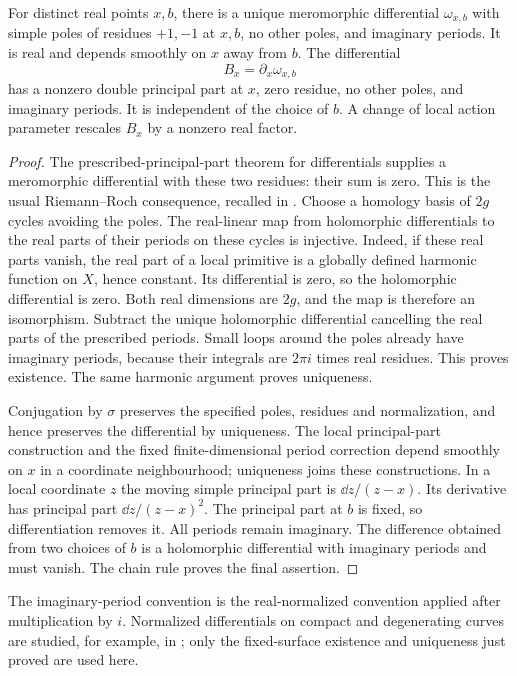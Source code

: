 \begin{lemma}\label{lem:v86-normalized}
For distinct real points $x,b$, there is a unique meromorphic
differential $\omega_{x,b}$ with simple poles of residues $+1,-1$
at $x,b$, no other poles, and imaginary periods. It is real and depends
smoothly on $x$ away from $b$. The differential
\[
                         B_x=\partial_x\omega_{x,b}
\]
has a nonzero double principal part at $x$, zero residue, no other
poles, and imaginary periods. It is independent of the choice of $b$.
A change of local action parameter rescales $B_x$ by a nonzero real
factor.
\end{lemma}
\begin{proof}
The prescribed-principal-part theorem for differentials supplies a
meromorphic differential with these two residues: their sum is zero.
This is the usual Riemann--Roch consequence, recalled in
\cite{V86Forster}. Choose a homology basis of $2g$ cycles avoiding the
poles. The real-linear map from holomorphic differentials to the real
parts of their periods on these cycles is injective. Indeed, if these
real parts vanish, the real part of a local primitive is a globally
defined harmonic function on $X$, hence constant. Its differential is
zero, so the holomorphic differential is zero. Both real dimensions
are $2g$, and the map is therefore an isomorphism. Subtract the unique
holomorphic differential cancelling the real parts of the prescribed
periods. Small loops around the poles already have imaginary periods,
because their integrals are $2\pi i$ times real residues. This proves
existence. The same harmonic argument proves uniqueness.

Conjugation by $\sigma$ preserves the specified poles, residues and
normalization, and hence preserves the differential by uniqueness.
The local principal-part construction and the fixed finite-dimensional
period correction depend smoothly on $x$ in a coordinate neighbourhood;
uniqueness joins these constructions. In a local coordinate $z$ the
moving simple principal part is $\dd z/(z-x)$. Its derivative has
principal part $\dd z/(z-x)^2$. The principal part at $b$ is fixed,
so differentiation removes it. All periods remain imaginary. The
difference obtained from two choices of $b$ is a holomorphic
differential with imaginary periods and must vanish. The chain rule
proves the final assertion.
\end{proof}
The imaginary-period convention is the real-normalized convention
applied after multiplication by $i$. Normalized differentials on
compact and degenerating curves are studied, for example, in
\cite{V86GKN}; only the fixed-surface existence and uniqueness just
proved are used here.

